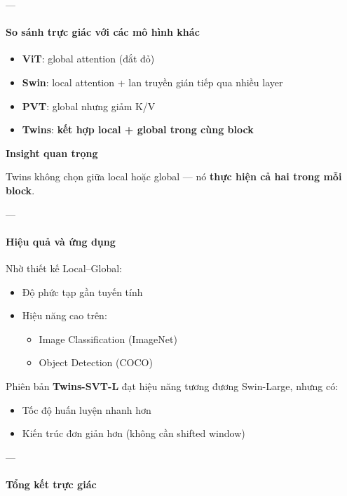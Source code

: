 ---

\paragraph{So sánh trực giác với các mô hình khác}

\begin{itemize}
	\item \textbf{ViT}: global attention (đắt đỏ)
	\item \textbf{Swin}: local attention + lan truyền gián tiếp qua nhiều layer
	\item \textbf{PVT}: global nhưng giảm K/V
	\item \textbf{Twins}: \textbf{kết hợp local + global trong cùng block}
\end{itemize}

\begin{mdframed}[style=infobox]
	\textbf{Insight quan trọng}
	
	Twins không chọn giữa local hoặc global —  
	nó \textbf{thực hiện cả hai trong mỗi block}.
\end{mdframed}

---

\paragraph{Hiệu quả và ứng dụng}

Nhờ thiết kế Local--Global:

\begin{itemize}
	\item Độ phức tạp gần tuyến tính
	\item Hiệu năng cao trên:
	\begin{itemize}
		\item Image Classification (ImageNet)
		\item Object Detection (COCO)
	\end{itemize}
\end{itemize}

Phiên bản \textbf{Twins-SVT-L} đạt hiệu năng tương đương Swin-Large, nhưng có:
\begin{itemize}
	\item Tốc độ huấn luyện nhanh hơn
	\item Kiến trúc đơn giản hơn (không cần shifted window)
\end{itemize}

---

\paragraph{Tổng kết trực giác}

